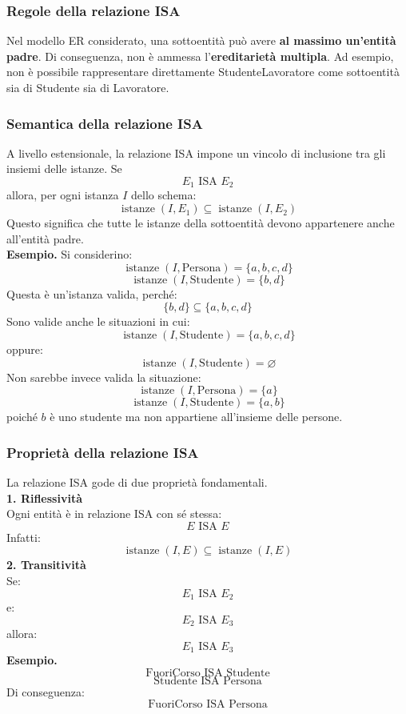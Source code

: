 \subsubsection*{Regole della relazione ISA}

Nel modello ER considerato, una sottoentità
può avere \textbf{al massimo un'entità padre}.
Di conseguenza, non è ammessa
l'\textbf{ereditarietà multipla}.
Ad esempio, non è possibile rappresentare
direttamente StudenteLavoratore come sottoentità
sia di Studente sia di Lavoratore.

\subsubsection*{Semantica della relazione ISA}

A livello estensionale, la relazione ISA
impone un vincolo di inclusione tra
gli insiemi delle istanze.
Se
\[
E_1 \text{ ISA } E_2
\]
allora, per ogni istanza $I$ dello schema:
\[
\boxed{
\operatorname{istanze}(I,E_1)
\subseteq
\operatorname{istanze}(I,E_2)
}
\]
Questo significa che tutte le istanze
della sottoentità devono appartenere
anche all'entità padre.\\
\textcolor{verdeEsempio}{\textbf{Esempio.}}
Si considerino:
\[
\operatorname{istanze}(I,\text{Persona})
=
\{a,b,c,d\}
\]
\[
\operatorname{istanze}(I,\text{Studente})
=
\{b,d\}
\]
Questa è un'istanza valida, perché:
\[
\{b,d\}\subseteq\{a,b,c,d\}
\]
Sono valide anche le situazioni in cui:
\[
\operatorname{istanze}(I,\text{Studente})
=
\{a,b,c,d\}
\]
oppure:
\[
\operatorname{istanze}(I,\text{Studente})
=
\varnothing
\]
Non sarebbe invece valida la situazione:
\[
\operatorname{istanze}(I,\text{Persona})
=
\{a\}
\]
\[
\operatorname{istanze}(I,\text{Studente})
=
\{a,b\}
\]
poiché $b$ è uno studente ma non appartiene
all'insieme delle persone.

\subsubsection*{Proprietà della relazione ISA}

La relazione ISA gode di due proprietà
fondamentali.\\
\textbf{1. Riflessività}\\
Ogni entità è in relazione ISA con sé stessa:
\[
E \text{ ISA } E
\]
Infatti:
\[
\operatorname{istanze}(I,E)
\subseteq
\operatorname{istanze}(I,E)
\]
\textbf{2. Transitività}\\
Se:
\[
E_1 \text{ ISA } E_2
\]
e:
\[
E_2 \text{ ISA } E_3
\]
allora:
\[
\boxed{E_1 \text{ ISA } E_3}
\]
\textcolor{verdeEsempio}{\textbf{Esempio.}}
\[
\text{FuoriCorso ISA Studente}
\]
\[
\text{Studente ISA Persona}
\]
Di conseguenza:
\[
\boxed{\text{FuoriCorso ISA Persona}}
\]

